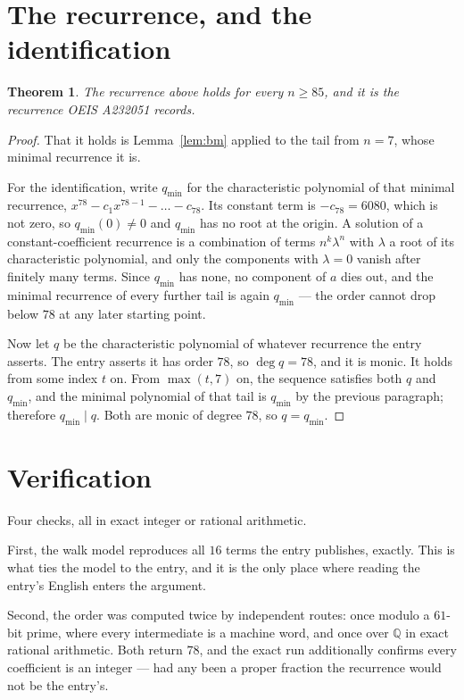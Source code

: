 \documentclass[11pt,a4paper]{article}
\theoremstyle{plain}
\newtheorem{theorem}{Theorem}
\theoremstyle{definition}
\begin{document}
\section{The recurrence, and the identification}

\begin{theorem}
The recurrence above holds for every $n\ge85$, and it is the recurrence OEIS A232051 records.
\end{theorem}

\begin{proof}
That it holds is Lemma~\ref{lem:bm} applied to the tail from $n=7$, whose minimal
recurrence it is.

For the identification, write $q_{\min}$ for the characteristic polynomial of that minimal
recurrence, $x^{78}-c_1x^{78-1}-\dots-c_{78}$. Its constant term is
$-c_{78}=6080$, which is not zero, so $q_{\min}(0)\neq0$ and $q_{\min}$ has no
root at the origin. A solution of a constant-coefficient recurrence is a combination of terms
$n^{k}\lambda^{n}$ with $\lambda$ a root of its characteristic polynomial, and only the
components with $\lambda=0$ vanish after finitely many terms. Since $q_{\min}$ has none, no
component of $a$ dies out, and the minimal recurrence of every further tail is again
$q_{\min}$ --- the order cannot drop below $78$ at any later starting point.

Now let $q$ be the characteristic polynomial of whatever recurrence the entry asserts. The
entry asserts it has order $78$, so $\deg q=78$, and it is monic. It holds from some
index $t$ on. From $\max(t,7)$ on, the sequence satisfies both $q$ and $q_{\min}$, and
the minimal polynomial of that tail is $q_{\min}$ by the previous paragraph; therefore
$q_{\min}\mid q$. Both are monic of degree $78$, so $q=q_{\min}$.
\end{proof}

\section{Verification}

Four checks, all in exact integer or rational arithmetic.

First, the walk model reproduces all $16$ terms the entry publishes, exactly. This is
what ties the model to the entry, and it is the only place where reading the entry's English
enters the argument.

Second, the order was computed twice by independent routes: once modulo a $61$-bit prime, where
every intermediate is a machine word, and once over $\mathbb{Q}$ in exact rational arithmetic.
Both return $78$, and the exact run additionally confirms every coefficient is an integer
--- had any been a proper fraction the recurrence would not be the entry's.
\end{document}
